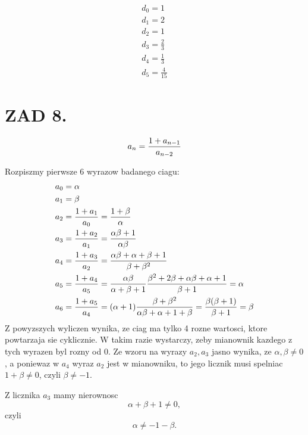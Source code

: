 \documentclass{article}[13pt]
\begin{document}
    \begin{align*}
        d_0=1\\
        d_1=2\\
        d_2=1\\
        d_3=\frac23\\
        d_4=\frac13\\
        d_5=\frac4{15}
    \end{align*}

    \section*{ZAD 8.}
    $$a_n={1+a_{n-1}\over a_{n-2}}$$
    
    Rozpiszmy pierwsze 6 wyrazow badanego ciagu:
    \begin{align*}
        a_0&=\alpha\\
        a_1&=\beta\\
        a_2&={1+a_1\over a_0}={1+\beta\over\alpha}\\
        a_3&={1+a_2\over a_1}={\alpha\beta+1\over \alpha\beta}\\
        a_4&={1+a_3\over a_2}={\alpha\beta+\alpha+\beta+1\over\beta+\beta^2}\\
        a_5&={1+a_4\over a_5}={\alpha\beta\over\alpha+\beta+1}{\beta^2+2\beta+\alpha\beta+\alpha+1\over\beta+1}=\alpha\\
        a_6&={1+a_5\over a_4}=(\alpha+1){\beta+\beta^2\over\alpha\beta+\alpha+1+\beta}={\beta(\beta+1)\over\beta+1}=\beta
    \end{align*}
    Z powyzszych wyliczen wynika, ze ciag ma tylko 4 rozne wartosci, ktore powtarzaja sie cyklicznie. W takim razie wystarczy, zeby mianownik kazdego z tych wyrazen byl rozny od 0. Ze wzoru na wyrazy $a_2, a_3$ jasno wynika, ze $\alpha,\beta\neq0$, a poniewaz w $a_4$ wyraz $a_2$ jest w mianowniku, to jego licznik musi spelniac $1+\beta\neq0$, czyli $\beta\neq -1$.
    \medskip

    Z licznika $a_3$ mamy nierownosc
    $$\alpha+\beta+1\neq0,$$
    czyli
    $$\alpha\neq-1-\beta.$$
\end{document}
